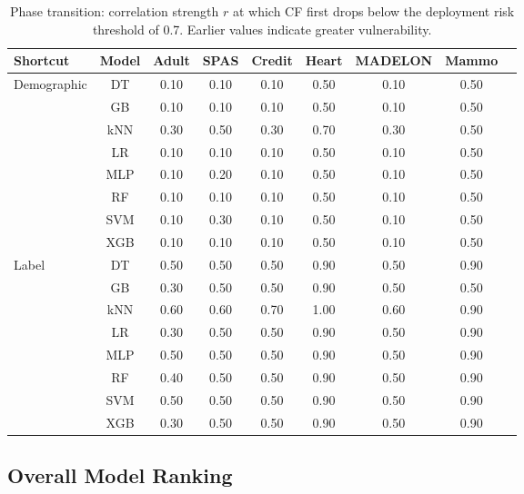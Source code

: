 \documentclass[conference]{IEEEtran}
\begin{document}
\begin{table}[t]
    \centering
    \footnotesize
    \setlength{\tabcolsep}{1.5pt}
    \caption{Phase transition: correlation strength $r$ at which CF first drops below the deployment risk threshold of 0.7. Earlier values indicate greater vulnerability.}
    \label{tab:heatmap}
    \begin{tabular}{lcccccccc}
        \toprule
        \textbf{Shortcut} & \textbf{Model} & \textbf{Adult} & \textbf{SPAS} & \textbf{Credit} & \textbf{Heart} & \textbf{MADELON} & \textbf{Mammo} \\
        \midrule
        \multirow{8}{*}{Demographic} & DT & 0.10 & 0.10 & 0.10 & 0.50 & 0.10 & 0.50 \\
        & GB & 0.10 & 0.10 & 0.10 & 0.50 & 0.10 & 0.50 \\
        & kNN & 0.30 & 0.50 & 0.30 & 0.70 & 0.30 & 0.50 \\
        & LR & 0.10 & 0.10 & 0.10 & 0.50 & 0.10 & 0.50 \\
        & MLP & 0.10 & 0.20 & 0.10 & 0.50 & 0.10 & 0.50 \\
        & RF & 0.10 & 0.10 & 0.10 & 0.50 & 0.10 & 0.50 \\
        & SVM & 0.10 & 0.30 & 0.10 & 0.50 & 0.10 & 0.50 \\
        & XGB & 0.10 & 0.10 & 0.10 & 0.50 & 0.10 & 0.50 \\
        \midrule
        \multirow{8}{*}{Label} & DT & 0.50 & 0.50 & 0.50 & 0.90 & 0.50 & 0.90 \\
        & GB & 0.30 & 0.50 & 0.50 & 0.90 & 0.50 & 0.50 \\
        & kNN & 0.60 & 0.60 & 0.70 & 1.00 & 0.60 & 0.90 \\
        & LR & 0.30 & 0.50 & 0.50 & 0.90 & 0.50 & 0.90 \\
        & MLP & 0.50 & 0.50 & 0.50 & 0.90 & 0.50 & 0.90 \\
        & RF & 0.40 & 0.50 & 0.50 & 0.90 & 0.50 & 0.90 \\
        & SVM & 0.50 & 0.50 & 0.50 & 0.90 & 0.50 & 0.90 \\
        & XGB & 0.30 & 0.50 & 0.50 & 0.90 & 0.50 & 0.90 \\
        \bottomrule
    \end{tabular}
\end{table}

\subsection{Overall Model Ranking}
\end{document}
